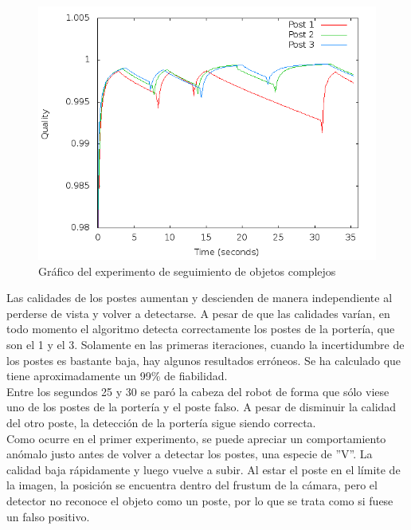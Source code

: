 \begin{figure} [h]
  \begin{center}
    \includegraphics[width=15cm]{img/cap5/exp2.png}
  \end{center}
  \caption{Gráfico del experimento de seguimiento de objetos complejos}
  \label{fig:exp2}
\end{figure}

Las calidades de los postes aumentan y descienden de manera independiente al perderse de vista y volver a detectarse. A pesar de que las calidades varían, en todo momento el algoritmo detecta correctamente los postes de la portería, que son el 1 y el 3. Solamente en las primeras iteraciones, cuando la incertidumbre de los postes es bastante baja, hay algunos resultados erróneos. Se ha calculado que tiene aproximadamente un 99\% de fiabilidad. \\

Entre los segundos 25 y 30 se paró la cabeza del robot de forma que sólo viese uno de los postes de la portería y el poste falso. A pesar de disminuir la calidad del otro poste, la detección de la portería sigue siendo correcta. \\

Como ocurre en el primer experimento, se puede apreciar un comportamiento anómalo justo antes de volver a detectar los postes, una especie de ''V''. La calidad baja rápidamente y luego vuelve a subir. Al estar el poste en el límite de la imagen, la posición se encuentra dentro del frustum de la cámara, pero el detector no reconoce el objeto como un poste, por lo que se trata como si fuese un falso positivo. 

